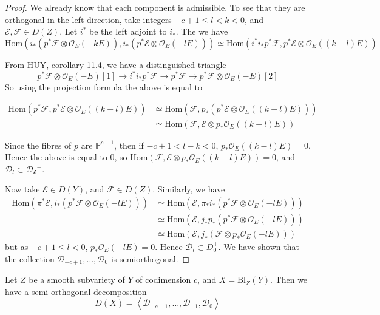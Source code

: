 \begin{proof}
We already know that each component is admissible. To see that they are orthogonal in the left direction, take integers $-c+1 \leq l <k <0$, and $\mathcal{E}, \mathcal{F}\in D(Z)$. Let $i^*$ be the left adjoint to $i_*$. The we have $$\mathrm{Hom}(i_{*}\left( p^{*}\mathcal{F}\otimes \mathcal{O}_{E}(-kE) \right), i_{*}\left( p^{*}\mathcal{E}\otimes \mathcal{O}_{E}(-lE) \right)  ) \simeq \mathrm{Hom}(i^{*}i_{*}p^{*}\mathcal{F}, p^{*}\mathcal{E}\otimes \mathcal{O}_{E}((k-l)E))$$

From HUY, corollary 11.4, we have a distinguished triangle $$p^{*}\mathcal{F}\otimes  \mathcal{O}_{E}(-E)[1]\to i^{*}i_{*}p^{*}\mathcal{F}\to p^{*}\mathcal{F}\to p^{*}\mathcal{F}\otimes \mathcal{O}_E(-E)[2]$$
So using the projection formula the above is equal to

\begin{align*}
\mathrm{Hom}(p^{*}\mathcal{F},p^{*}\mathcal{E} \otimes  \mathcal{O}_{E}((k-l)E)) &\simeq \mathrm{Hom}(\mathcal{F},p_{*}(p^{*}\mathcal{E} \otimes  \mathcal{O}_{E}((k-l)E)))  \\
&\simeq \mathrm{Hom}(\mathcal{F},\mathcal{E} \otimes p_{*} \mathcal{O}_{E}((k-l)E)) 
\end{align*}

Since the fibres of $p$ are $\mathbb{P}^{c-1}$, then if $-c+1<l-k<0$, $p_{*}\mathcal{O}_{E}((k-l)E)=0$. Hence the above is equal to 0, so $\mathrm{Hom}(\mathcal{F},\mathcal{E} \otimes p_{*} \mathcal{O}_{E}((k-l)E)) =0$, and $\mathcal{D}_{l}\subset \mathcal{D_k}^\perp$.

Now take $\mathcal{E}\in D(Y)$, and $\mathcal{F}\in D(Z)$. Similarly, we have
\begin{align*}
\mathrm{Hom}(\pi^{*}\mathcal{E},i_{*}(p^{*}\mathcal{F}\otimes \mathcal{O}_{E}(-lE))) &\simeq \mathrm{Hom}(\mathcal{E},\pi_{*}i_{*}(p^{*}\mathcal{F}\otimes \mathcal{O}_{E}(-lE))) \\
&\simeq \mathrm{Hom}(\mathcal{E},j_{*}p_{*}(p^{*}\mathcal{F}\otimes \mathcal{O}_{E}(-lE)))  \\
&\simeq \mathrm{Hom}(\mathcal{E},j_{*}(\mathcal{F}\otimes p_{*}\mathcal{O}_{E}(-lE))) 
\end{align*}
but as $-c+1\leq l<0$, $p_{*}\mathcal{O}_{E}(-lE)=0$. Hence $\mathcal{D}_{l}\subset D_{0}^\perp$. We have shown that the collection $\mathcal{D}_{-c+1},\dots,\mathcal{D}_0$ is semiorthogonal.  
\end{proof}

\begin{theorem}{}{}
    Let $Z$ be a smooth subvariety of $Y$ of codimension $c$, and $X = \mathrm{Bl}_{Z}(Y)$. Then we have a semi orthogonal decomposition $$ D(X) = \left< \mathcal{D}_{-c+1},\dots,\mathcal{D}_{-1}, \mathcal{D}_0 \right> $$
\end{theorem}

